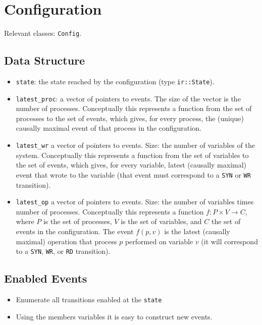 \documentclass{llncs}
\begin{document}
\section{Configuration}
Relevant classes:
\verb!Config!.

\subsection{Data Structure}

\begin{itemize}
\item
  \verb!state!: the state reached by the configuration (type \verb!ir::State!).
\item
  \verb!latest_proc!:
  a vector of pointers to events. The size of the vector is the number of
  processes. Conceptually this represents a function from the set of processes
  to the set of events, which gives, for every process, the (unique) causally
  maximal event of that process in the configuration.

\item
  \verb!latest_wr!
  a vector of pointers to events. Size: the number of variables of the system.
  Conceptually this represents a function from the set of variables
  to the set of events, which gives, for every variable, latest (causally
  maximal) event that wrote to the variable (that event must correspond to a
  \verb!SYN! or \verb!WR! transition).

\item
  \verb!latest_op!
  a vector of pointers to events. Size: the number of variables times number of
  processes.
  Conceptually this represents a function $f \colon P \times V \to C$,
  where $P$ is the set of processes, $V$ is the set of variables, and $C$ the
  set of events in the configuration.
  The event $f (p,v)$ is the latest (causally maximal) operation that process
  $p$ performed on variable $v$ (it will correspond to a \verb!SYN!, \verb!WR!,
  or \verb!RD! transition).
\end{itemize}

\subsection{Enabled Events}

\begin{itemize}
\item
  Enumerate all transitions enabled at the \verb!state!
\item
  Using the members variables it is easy to construct new events.
\end{itemize}
\end{document}
